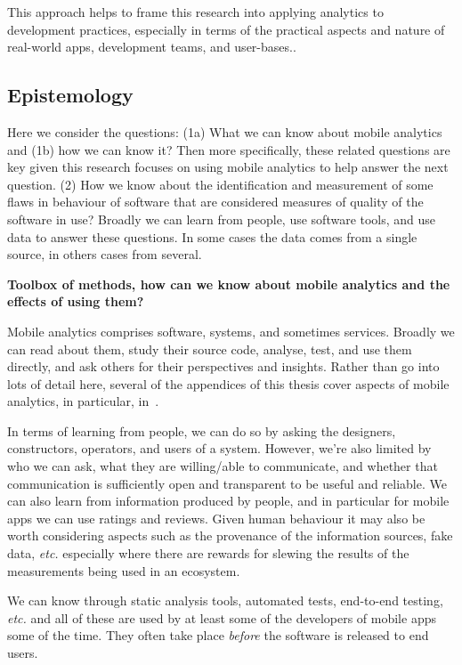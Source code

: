 This approach helps to frame this research into applying analytics to development practices, especially in terms of the practical aspects and nature of real-world apps, development teams, and user-bases..

\subsection{Epistemology}
Here we consider the questions: (1a) What we can know about mobile analytics and (1b) how we can know it? Then more specifically, these related questions are key given this research focuses on using mobile analytics to help answer the next question. (2) How we know about the identification and measurement of some flaws in behaviour of software that are considered measures of quality of the software in use? Broadly we can learn from people, use software tools, and use data to answer these questions. In some cases the data comes from a single source, in others cases from several.

\textbf{Toolbox of methods, how can we know about mobile analytics and the effects of using them?} 

Mobile analytics comprises software, systems, and sometimes services. Broadly we can read about them, study their source code, analyse, test, and use them directly, and ask others for their perspectives and insights. Rather than go into lots of detail here, several of the appendices of this thesis cover aspects of mobile analytics, in particular, in~\href{chapter-on-mobile-analytics}{\emph{}}. 

In terms of learning from people, we can do so by asking the designers, constructors, operators, and users of a system. However, we're also limited by who we can ask, what they are willing/able to communicate, and whether that communication is sufficiently open and transparent to be useful and reliable. We can also learn from information produced by people, and in particular for mobile apps we can use ratings and reviews. Given human behaviour it may also be worth considering aspects such as the provenance of the information sources, fake data, \emph{etc.} especially where there are rewards for slewing the results of the measurements being used in an ecosystem. 

We can know through static analysis tools, automated tests, end-to-end testing, \emph{etc.} and all of these are used by at least some of the developers of mobile apps some of the time. They often take place \textit{before} the software is released to end users.

